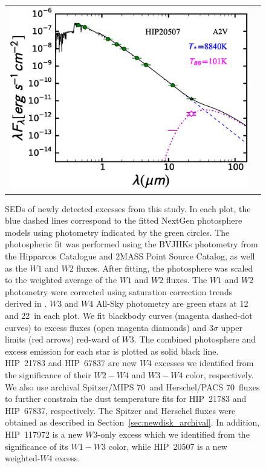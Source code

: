 \begin{figure}
\begin{tabular}{cc}
\includegraphics[scale=0.4]{Ch4/HIP20507}
\end{tabular}
\caption{SEDs of newly detected excesses from this study. In each plot, the blue dashed lines correspond to the fitted NextGen photosphere models using photometry indicated by the green circles. The photospheric fit was performed using the BVJHKs photometry from the Hipparcos Catalogue and 2MASS Point Source Catalog, as well as the $W1$ and $W2$ fluxes.  After fitting, the photosphere was scaled to the weighted average of the $W1$ and $W2$ fluxes. The $W1$ and $W2$ photometry were corrected using saturation correction trends derived in . $W3$ and $W4$ All-Sky photometry are green stars at 12 and 22\micron\ in each plot. We fit blackbody curves (magenta dashed-dot curves) to excess fluxes (open magenta diamonds) and 3$\sigma$ upper limits (red arrows) red-ward of $W3$. The combined photosphere and excess emission for each star is plotted as solid black line. HIP~21783 and HIP~67837 are new $W4$ excesses we identified from the significance of their $W2-W4$ and $W3-W4$ color, respectively. We also use archival Spitzer/MIPS 70\micron\ and Herschel/PACS 70\micron\ fluxes to further constrain the dust temperature fits for HIP~21783 and HIP~67837, respectively. The Spitzer and Herschel fluxes were obtained as described in Section~\ref{sec:newdisk_archival}. In addition, HIP~117972 is a new $W3$-only excess which we identified from the significance of its $W1-W3$ color, while HIP~20507 is a new weighted-$W4$ excess.}
\label{fig:SEDs}
\end{figure}

